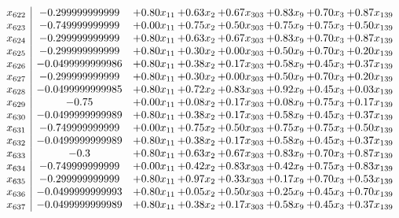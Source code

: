 \documentclass[8pt]{article}
\begin{document}
\[\begin{array}{c| c c@{\hskip 2pt} c@{\hskip 2pt} c@{\hskip 2pt} c@{\hskip 2pt} c@{\hskip 2pt} c@{\hskip 2pt} }
 x_{622}   &  -0.299999999999 & +  0.80 x_{11} & +  0.63 x_{2} & +  0.67 x_{303} & +  0.83 x_{9} & +  0.70 x_{3} & +  0.87 x_{139}\\
 x_{623}   &  -0.749999999999 & +  0.00 x_{11} & +  0.75 x_{2} & +  0.50 x_{303} & +  0.75 x_{9} & +  0.75 x_{3} & +  0.50 x_{139}\\
 x_{624}   &  -0.299999999999 & +  0.80 x_{11} & +  0.63 x_{2} & +  0.67 x_{303} & +  0.83 x_{9} & +  0.70 x_{3} & +  0.87 x_{139}\\
 x_{625}   &  -0.299999999999 & +  0.80 x_{11} & +  0.30 x_{2} & +  0.00 x_{303} & +  0.50 x_{9} & +  0.70 x_{3} & +  0.20 x_{139}\\
 x_{626}   &  -0.0499999999986 & +  0.80 x_{11} & +  0.38 x_{2} & +  0.17 x_{303} & +  0.58 x_{9} & +  0.45 x_{3} & +  0.37 x_{139}\\
 x_{627}   &  -0.299999999999 & +  0.80 x_{11} & +  0.30 x_{2} & +  0.00 x_{303} & +  0.50 x_{9} & +  0.70 x_{3} & +  0.20 x_{139}\\
 x_{628}   &  -0.0499999999985 & +  0.80 x_{11} & +  0.72 x_{2} & +  0.83 x_{303} & +  0.92 x_{9} & +  0.45 x_{3} & +  0.03 x_{139}\\
 x_{629}   &  -0.75 & +  0.00 x_{11} & +  0.08 x_{2} & +  0.17 x_{303} & +  0.08 x_{9} & +  0.75 x_{3} & +  0.17 x_{139}\\
 x_{630}   &  -0.0499999999989 & +  0.80 x_{11} & +  0.38 x_{2} & +  0.17 x_{303} & +  0.58 x_{9} & +  0.45 x_{3} & +  0.37 x_{139}\\
 x_{631}   &  -0.749999999999 & +  0.00 x_{11} & +  0.75 x_{2} & +  0.50 x_{303} & +  0.75 x_{9} & +  0.75 x_{3} & +  0.50 x_{139}\\
 x_{632}   &  -0.0499999999989 & +  0.80 x_{11} & +  0.38 x_{2} & +  0.17 x_{303} & +  0.58 x_{9} & +  0.45 x_{3} & +  0.37 x_{139}\\
 x_{633}   &  -0.3 & +  0.80 x_{11} & +  0.63 x_{2} & +  0.67 x_{303} & +  0.83 x_{9} & +  0.70 x_{3} & +  0.87 x_{139}\\
 x_{634}   &  -0.749999999999 & +  0.00 x_{11} & +  0.42 x_{2} & +  0.83 x_{303} & +  0.42 x_{9} & +  0.75 x_{3} & +  0.83 x_{139}\\
 x_{635}   &  -0.299999999999 & +  0.80 x_{11} & +  0.97 x_{2} & +  0.33 x_{303} & +  0.17 x_{9} & +  0.70 x_{3} & +  0.53 x_{139}\\
 x_{636}   &  -0.0499999999993 & +  0.80 x_{11} & +  0.05 x_{2} & +  0.50 x_{303} & +  0.25 x_{9} & +  0.45 x_{3} & +  0.70 x_{139}\\
 x_{637}   &  -0.0499999999989 & +  0.80 x_{11} & +  0.38 x_{2} & +  0.17 x_{303} & +  0.58 x_{9} & +  0.45 x_{3} & +  0.37 x_{139}\\

\end{array}\]
\end{document}

